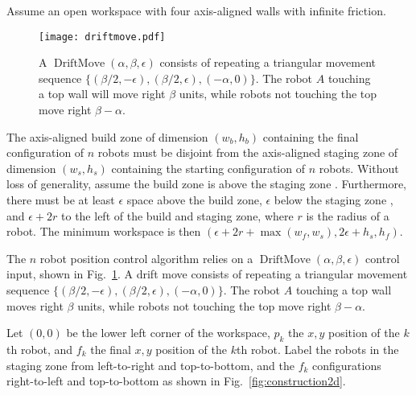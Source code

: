 Assume an open workspace with four axis-aligned walls with infinite friction.

\begin{figure}
\begin{center}
	\texttt{[image: driftmove.pdf]}
\end{center}
\caption{\label{fig:driftmove}
A  $\operatorname{DriftMove}(\alpha, \beta, \epsilon)$ consists of repeating a triangular movement sequence $\{ (\beta/2,-\epsilon),(\beta/2,\epsilon),(-\alpha,0)\}$. The robot $A$ touching a top wall will move right $\beta$ units, while robots not touching the top move right $\beta-\alpha$.
}
\end{figure}



The axis-aligned build zone of dimension $(w_b, h_b)$ containing the final configuration of $n$ robots must be disjoint from the axis-aligned staging zone of dimension $(w_s, h_s)$  containing the starting configuration of $n$ robots. Without loss of generality, assume the build zone  is above the staging zone . 
Furthermore, there must be at least $\epsilon$ space above the build zone, $\epsilon$ below the staging zone , and $\epsilon + 2r$ to the left of the build and staging zone, where $r$ is the radius of a robot.  The minimum workspace is then $(\epsilon + 2r + \max(w_f,w_s), 2\epsilon + h_s,h_f)$.

The $n$ robot position control algorithm relies on a $\operatorname{DriftMove}(\alpha, \beta, \epsilon)$ control input, shown in Fig.\  \ref{fig:driftmove}.
A drift move consists of repeating a triangular movement sequence $\{ (\beta/2,-\epsilon),(\beta/2,\epsilon),(-\alpha,0)\}$. The robot $A$ touching a top wall moves right $\beta$ units, while robots not touching the top move right $\beta-\alpha$.

Let $(0,0)$ be the lower left corner of the workspace, $p_k$ the $x,y$ position of the $k$th robot, and $f_k$ the final $x,y$ position of the $k$th robot. Label the robots in the staging zone from left-to-right and top-to-bottom, and the $f_k$ configurations right-to-left and top-to-bottom as shown in Fig.~\ref{fig:construction2d}.

